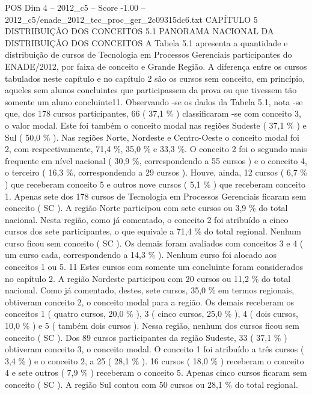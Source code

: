 \begin{textsample}{POS Dim 4 – 2012\_c5 – Score -1.00 – 2012\_c5/enade\_2012\_tec\_proc\_ger\_2c09315dc6.txt}  \label{ex:f4_pos_251}
CAPÍTULO 5 DISTRIBUIÇÃO DOS CONCEITOS 5.1 PANORAMA NACIONAL DA DISTRIBUIÇÃO DOS CONCEITOS A Tabela 5.1 apresenta a quantidade e distribuição de cursos de Tecnologia em Processos Gerenciais participantes do ENADE/2012, por faixa de conceito e Grande Região.
A diferença entre os cursos tabulados neste capítulo e no capítulo 2 são os cursos sem conceito, em princípio, aqueles sem alunos concluintes que participassem da prova ou que tivessem tão somente um aluno concluinte11.
Observando -se os dados da Tabela 5.1, nota -se que, dos 178 cursos participantes, 66 ( 37,1 \% ) classificaram -se com conceito 3, o valor modal.
Este foi também o conceito modal nas regiões Sudeste ( 37,1 \% ) e Sul ( 50,0 \% ).
Nas regiões Norte, Nordeste e Centro-Oeste o conceito modal foi 2, com respectivamente, 71,4 \%, 35,0 \% e 33,3 \%.
O conceito 2 foi o segundo mais frequente em nível nacional ( 30,9 \%, correspondendo a 55 cursos ) e o conceito 4, o terceiro ( 16,3 \%, correspondendo a 29 cursos ).
Houve, ainda, 12 cursos ( 6,7 \% ) que receberam conceito 5 e outros nove cursos ( 5,1 \% ) que receberam conceito 1.
Apenas sete dos 178 cursos de Tecnologia em Processos Gerenciais ficaram sem conceito ( SC ).
A região Norte participou com sete cursos ou 3,9 \% do total nacional.
Nesta região, como já comentado, o conceito 2 foi atribuído a cinco cursos dos sete participantes, o que equivale a 71,4 \% do total regional.
Nenhum curso ficou sem conceito ( SC ).
Os demais foram avaliados com conceitos 3 e 4 ( um curso cada, correspondendo a 14,3 \% ).
Nenhum curso foi alocado aos conceitos 1 ou 5. 11 Estes cursos com somente um concluinte foram considerados no capítulo 2.
A região Nordeste participou com 20 cursos ou 11,2 \% do total nacional.
Como já comentado, destes, sete cursos, 35,0 \% em termos regionais, obtiveram conceito 2, o conceito modal para a região.
Os demais receberam os conceitos 1 ( quatro cursos, 20,0 \% ), 3 ( cinco cursos, 25,0 \% ), 4 ( dois cursos, 10,0 \% ) e 5 ( também dois cursos ).
Nessa região, nenhum dos cursos ficou sem conceito ( SC ).
Dos 89 cursos participantes da região Sudeste, 33 ( 37,1 \% ) obtiveram conceito 3, o conceito modal.
O conceito 1 foi atribuído a três cursos ( 3,4 \% ) e o conceito 2, a 25 ( 28,1 \% ). 16 cursos ( 18,0 \% ) receberam o conceito 4 e sete outros ( 7,9 \% ) receberam o conceito 5.
Apenas cinco cursos ficaram sem conceito ( SC ).
A região Sul contou com 50 cursos ou 28,1 \% do total regional.

\end{textsample}
